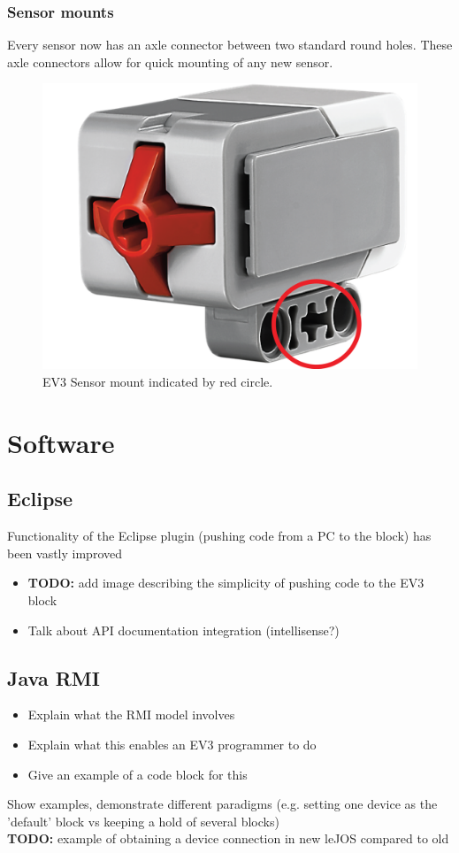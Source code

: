 \documentclass[11pt, a4paper, oneside]{article}
\begin{document}
		\subsubsection{Sensor mounts}
		Every sensor now has an axle connector between two standard round holes. These axle connectors allow for quick mounting of any new sensor.
		\begin{figure}[h!]
	  	\centering
	  	\includegraphics[scale=0.25]{img/EV3SensorMount.png}
		\caption{EV3 Sensor mount indicated by red circle.}
		\end{figure}			
		

	\section{Software}
	\subsection{Eclipse}
  Functionality of the Eclipse plugin (pushing code from a PC to the block) has been vastly improved\\
  \begin{itemize}
	\item  \textbf{TODO:} add image describing the simplicity of pushing code to the EV3 block
	\item Talk about API documentation integration (intellisense?)
  \end{itemize}
	\subsection{Java RMI}
	\begin{itemize}
		\item Explain what the RMI model involves
		\item Explain what this enables an EV3 programmer to do
		\item Give an example of a code block for this
	\end{itemize}
    Show examples, demonstrate different paradigms (e.g. setting one device as the 'default' block vs keeping a hold of several blocks)\\
    \textbf{TODO:} example of obtaining a device connection in new leJOS compared to old
\end{document}

